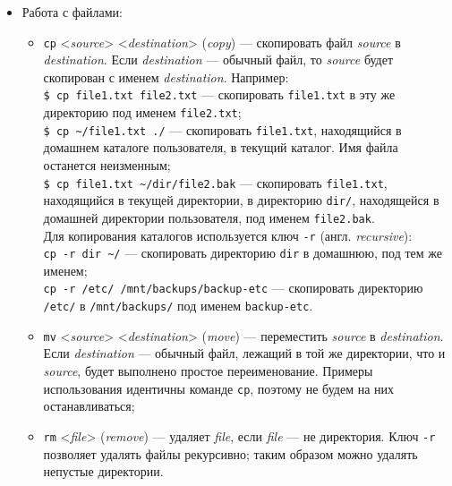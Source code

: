 \begin{itemize}
\begin{itemize}
  \end{itemize}
 \item Работа с файлами:
  \begin{itemize}
   \item \texttt{cp} <\emph{source}> <\emph{destination}> (\emph{copy}) --- скопировать файл \emph{source} в \emph{destination}. Если \emph{destination} --- обычный файл, то \emph{source} будет скопирован с именем \emph{destination}. Например:\\
    \texttt{\$ cp file1.txt file2.txt} --- скопировать \texttt{file1.txt} в эту же директорию под именем \texttt{file2.txt};\\
    \texttt{\$ cp \~{}/file1.txt ./} --- скопировать \texttt{file1.txt}, находящийся в домашнем каталоге пользователя, в текущий каталог. Имя файла останется неизменным;\\
    \texttt{\$ cp file1.txt \~{}/dir/file2.bak} --- скопировать \texttt{file1.txt}, находящийся в текущей директории, в директорию \texttt{dir/}, находящейся в домашней директории пользователя, под именем \texttt{file2.bak}.\\
   Для копирования каталогов используется ключ \texttt{-r} (англ. \emph{recursive}):\\
    \texttt{cp -r dir \~{}/} --- скопировать директорию \texttt{dir} в домашнюю, под тем же именем;\\
    \texttt{cp -r /etc/ /mnt/backups/backup-etc} --- скопировать директорию \texttt{/etc/} в \texttt{/mnt/backups/} под именем \texttt{backup-etc}.
   \item \texttt{mv} <\emph{source}> <\emph{destination}> (\emph{move}) --- переместить \emph{source} в \emph{des\-ti\-na\-ti\-on}. Если \emph{destination} --- обычный файл, лежащий в той же директории, что и \emph{source}, будет выполнено простое переименование. Примеры использования идентичны команде \texttt{cp}, поэтому не будем на них останавливаться;
   \item \texttt{rm} <\emph{file}> (\emph{remove}) --- удаляет \emph{file}, если \emph{file} --- не директория. Ключ \texttt{-r} позволяет удалять файлы рекурсивно; таким образом можно удалять непустые директории.
  \end{itemize}
\end{itemize}

